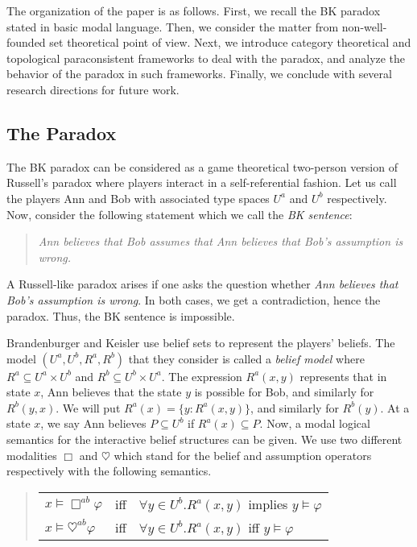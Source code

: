\documentclass{article}
\begin{document}
The organization of the paper is as follows. First, we recall the BK paradox stated in basic modal language. Then, we consider the matter from non-well-founded set theoretical point of view. Next, we introduce category theoretical and topological paraconsistent frameworks to deal with the paradox, and analyze the behavior of the paradox in such frameworks. Finally, we conclude with several research directions for future work.

\subsection{The Paradox}

The BK paradox can be considered as a game theoretical two-person version of Russell's paradox where players interact in a self-referential fashion. Let us call the players Ann and Bob with associated type spaces $U^{a}$ and $U^{b}$ respectively. Now, consider the following statement which we call the \emph{BK sentence}:
\begin{quote}
\emph{Ann believes that Bob assumes that Ann believes that Bob's assumption is wrong.}
\end{quote}

A Russell-like paradox arises if one asks the question whether \emph{Ann believes that Bob's assumption is wrong}. In both cases, we get a contradiction, hence the paradox. Thus, the BK sentence is impossible.

Brandenburger and Keisler use belief sets to represent the players' beliefs. The model $(U^{a}, U^{b}, R^{a}, R^{b})$ that they consider is called a \emph{belief model}  where $R^{a} \subseteq U^{a} \times U^{b}$ and $R^{b} \subseteq U^{b} \times U^{a}$. The expression $R^{a}(x, y)$ represents that in state $x$, Ann believes that the state $y$ is possible for Bob, and similarly for $R^{b}(y, x)$. We will put $R^{a}(x) = \{ y : R^{a}(x, y) \}$, and similarly for $R^b(y)$. At a state $x$, we say Ann believes $P \subseteq U^{b}$ if $R^{a}(x) \subseteq P$. Now, a modal logical semantics for the interactive belief structures can be given. We use two different modalities $\Box$ and $\heartsuit$ which stand for the belief and assumption operators respectively with the following semantics.

\begin{quote}\begin{tabular}{lll}
$x \models \Box^{ab} \varphi $ & iff & $\forall y \in U^{b}. R^{a}(x, y)$ implies $y \models \varphi$ \\
$x \models \heartsuit^{ab} \varphi $ & iff & $\forall y \in U^{b}. R^{a}(x, y)$ iff $y \models \varphi$ \\
\end{tabular}\end{quote}
\end{document}
